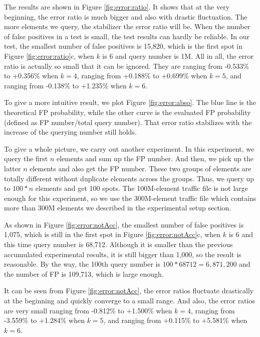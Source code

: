 The results are shown in Figure \ref{fig:error:ratio}. It shows that at the very beginning, the error ratio is much bigger and also with drastic fluctuation. The more elements we query, the stabilizer the error ratio will be.
When the number of false positives in a test is small, the test results can hardly be reliable. In our test, the smallest number of false positives is 15,820, which is the first spot in Figure \ref{fig:error:ratio}c, when $k$ is 6 and query number is 1M.
All in all, the error ratio is actually so small that it can be ignored. They are ranging from -0.533\% to +0.356\% when $k=4$, ranging from +0.188\% to +0.699\% when $k=5$, and ranging from -0.138\% to +1.235\% when $k=6$.



 To give a more intuitive result, we plot Figure \ref{fig:error:abso}. The blue line is the theoretical FP probability, while the other curve is the evaluated FP probability (defined as FP number/total query number). That error ratio stabilizes with the increase of the querying number still holds.


To give a whole picture, we carry out another experiment. In this experiment, we query the first $n$ elements and sum up the FP number. And then, we pick up the latter $n$ elements and also get the FP number. These two groups of elements are totally different without duplicate elements across the groups. Thus, we query up to $100*n$ elements and get 100 spots. The 100M-element traffic file is not large enough for this experiment, so we use the 300M-element traffic file which contains more than 300M elements we described in the experimental setup section.

As shown in Figure \ref{fig:error:notAcc}, the smallest number of false positives is 1,075, which is still in the first spot in Figure \ref{fig:error:notAcc}c, when $k$ is 6 and this time query number is 68,712. Although it is smaller than the previous accumulated experimental results, it is still bigger than 1,000, so the result is reasonable. By the way, the 100th query number is $100*68712=6,871,200$ and the number of FP is 109,713, which is large enough.

 It can be seen from Figure \ref{fig:error:notAcc}, the error ratios fluctuate drastically at the beginning and quickly converge to a small range. And also, the error ratios are very small ranging from -0.812\% to +1.500\% when $k=4$, ranging from -3.559\% to +1.284\% when $k=5$, and ranging from +0.115\% to +5.581\% when $k=6$.

